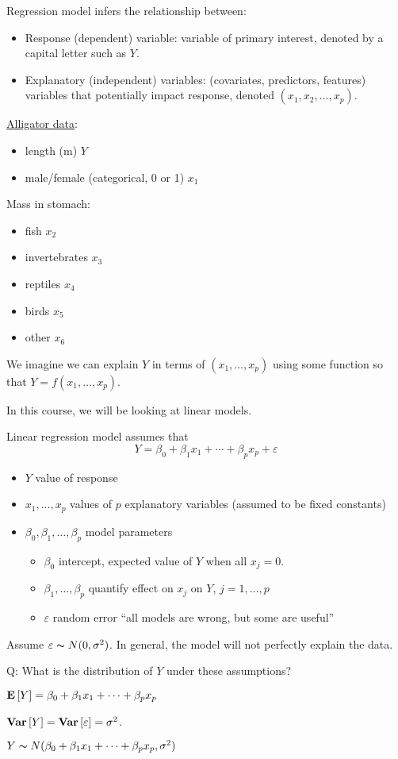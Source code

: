 Regression model infers the relationship between:
\begin{itemize}
    \item Response (dependent) variable:
          variable of primary interest, denoted by
          a capital letter such as $ Y $.
    \item Explanatory (independent) variables:
          (covariates, predictors, features) variables
          that potentially impact response,
          denoted $ (x_1,x_2,\ldots,x_p) $.
\end{itemize}
\underline{Alligator data}:
\begin{itemize}
    \item length (m) $ Y $
    \item male/female (categorical, 0 or 1) $ x_1 $
\end{itemize}
Mass in stomach:
\begin{itemize}
    \item fish $ x_2 $
    \item invertebrates $ x_3 $
    \item reptiles $ x_4 $
    \item birds $ x_5 $
    \item other $ x_6 $
\end{itemize}
We imagine we can explain $ Y $ in terms
of $ (x_1,\ldots,x_p) $ using some function
so that $ Y=f(x_1,\ldots,x_p) $.

In this course, we will be looking at linear models.

Linear regression model assumes that
\[ Y=\beta_0+\beta_1x_1+\cdots+\beta_p x_p+\varepsilon \]
\begin{itemize}
    \item $ Y $ value of response
    \item $ x_1,\ldots,x_p $ values of $ p $ explanatory variables
          (assumed to be fixed constants)
    \item $ \beta_0,\beta_1,\ldots,\beta_p $ model parameters
          \begin{itemize}
              \item $ \beta_0 $ intercept, expected value of $ Y $
                    when all $ x_j=0 $.
              \item $ \beta_1,\ldots,\beta_p $ quantify effect on $ x_j $
                    on $ Y $, $ j=1,\ldots,p $
              \item $ \varepsilon $ random error ``all models are wrong, but some
                    are useful''
          \end{itemize}
\end{itemize}
Assume $ \varepsilon \thicksim N(0,\sigma^2) $.
In general, the model will not perfectly explain the data.

Q\@: What is the distribution of $ Y $ under these assumptions?

$ \bm{\mathrm{E}}\left[Y\right]=\beta_0+\beta_1x_1+\cdots+\beta_p x_p $

$ \bm{\mathrm{Var}}\left[Y\right]=\bm{\mathrm{Var}}\left[\varepsilon\right]=\sigma^2 $.

$ Y \thicksim N(\beta_0+\beta_1x_1+\cdots+\beta_p x_p,\sigma^2) $
